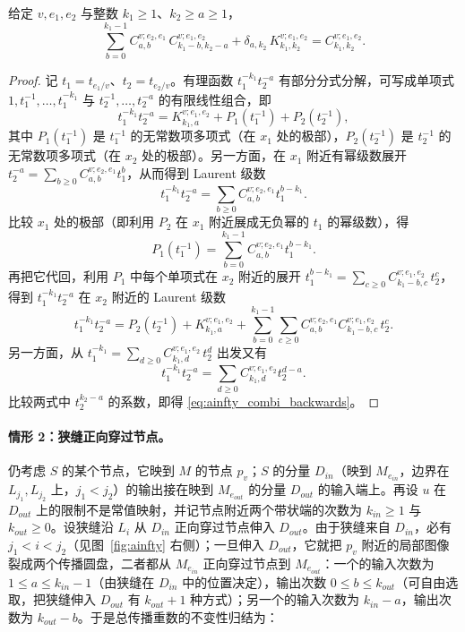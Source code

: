 \begin{lemma}\label{l:ainfty_combi_backwards}
给定 $v,e_1,e_2$ 与整数 $k_1\geq 1$、$k_2\geq a\geq 1$，
\begin{equation}\label{eq:ainfty_combi_backwards}
\sum_{b=0}^{k_{1}-1} C^{v;e_{2},e_{1}}_{a,b}\, C^{v;e_{1},e_{2}}_{k_{1}-b,k_{2}-a}
+\delta_{a,k_{2}}\,K^{v;e_{1},e_{2}}_{k_{1},k_{2}} =
C^{v;e_{1},e_{2}}_{k_{1},k_{2}}.
\end{equation}
\end{lemma}

\begin{proof}
记 $t_1=t_{e_1/v}$、$t_2=t_{e_2/v}$。有理函数 $t_1^{-k_1}t_2^{-a}$ 有部分分式分解，可写成单项式 $1,t_1^{-1},\dots,t_1^{-k_1}$ 与 $t_2^{-1},\dots,t_2^{-a}$ 的有限线性组合，即
\[
t_1^{-k_1}t_2^{-a}=K^{v;e_1,e_2}_{k_1,a}+P_1(t_1^{-1})+P_2(t_2^{-1}),
\]
其中 $P_1(t_1^{-1})$ 是 $t_1^{-1}$ 的无常数项多项式（在 $x_1$ 处的极部），$P_2(t_2^{-1})$ 是 $t_2^{-1}$ 的无常数项多项式（在 $x_2$ 处的极部）。另一方面，在 $x_1$ 附近有幂级数展开 $t_2^{-a}=\sum_{b\geq 0} C^{v;e_2,e_1}_{a,b} t_1^b$，从而得到 Laurent 级数
\[
t_1^{-k_1} t_2^{-a}=\sum_{b\geq 0} C^{v;e_2,e_1}_{a,b} t_1^{b-k_1}.
\]
比较 $x_1$ 处的极部（即利用 $P_2$ 在 $x_1$ 附近展成无负幂的 $t_1$ 的幂级数），得
\[
P_1(t_1^{-1})=\sum_{b=0}^{k_1-1} C^{v;e_2,e_1}_{a,b} t_1^{b-k_1}.
\]
再把它代回，利用 $P_1$ 中每个单项式在 $x_2$ 附近的展开 $t_1^{b-k_1}=\sum_{c\geq 0}C^{v;e_1,e_2}_{k_1-b,c}\,t_2^c$，得到 $t_1^{-k_1}t_2^{-a}$ 在 $x_2$ 附近的 Laurent 级数
\[
t_1^{-k_1}t_2^{-a}=P_2(t_2^{-1})+K^{v;e_1,e_2}_{k_1,a}+
\sum_{b=0}^{k_1-1}\sum_{c\geq 0}
C^{v;e_2,e_1}_{a,b} C^{v;e_1,e_2}_{k_1-b,c}\, t_2^c.
\]
另一方面，从 $t_1^{-k_1}=\sum_{d\geq 0} C_{k_1,d}^{v;e_1,e_2}\,t_2^d$ 出发又有
\[
t_1^{-k_1} t_2^{-a}=\sum_{d\geq 0} C^{v;e_1,e_2}_{k_1,d} t_2^{d-a}.
\]
比较两式中 $t_2^{k_2-a}$ 的系数，即得 \eqref{eq:ainfty_combi_backwards}。
\end{proof}

\paragraph{情形 2：狭缝正向穿过节点。}
仍考虑 $S$ 的某个节点，它映到 $M$ 的节点 $p_v$；$S$ 的分量 $D_{in}$（映到 $M_{e_{in}}$，边界在 $L_{j_1},L_{j_2}$ 上，$j_1<j_2$）的输出接在映到 $M_{e_{out}}$ 的分量 $D_{out}$ 的输入端上。再设 $u$ 在 $D_{out}$ 上的限制不是常值映射，并记节点附近两个带状端的次数为 $k_{in}\geq 1$ 与 $k_{out}\geq 0$。设狭缝沿 $L_i$ 从 $D_{in}$ 正向穿过节点伸入 $D_{out}$。由于狭缝来自 $D_{in}$，必有 $j_1<i<j_2$（见图~\ref{fig:ainfty} 右侧）；一旦伸入 $D_{out}$，它就把 $p_v$ 附近的局部图像裂成两个传播圆盘，二者都从 $M_{e_{in}}$ 正向穿过节点到 $M_{e_{out}}$：一个的输入次数为 $1\leq a\leq k_{in}-1$（由狭缝在 $D_{in}$ 中的位置决定），输出次数 $0\leq b\leq k_{out}$（可自由选取，把狭缝伸入 $D_{out}$ 有 $k_{out}+1$ 种方式）；另一个的输入次数为 $k_{in}-a$，输出次数为 $k_{out}-b$。于是总传播重数的不变性归结为：


